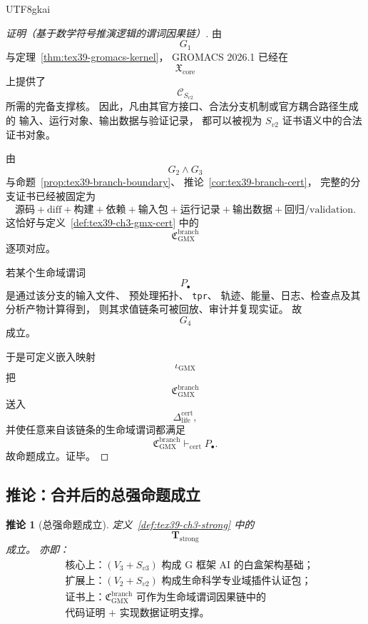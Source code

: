 \documentclass[12pt]{article}
\newtheorem{corollary}{推论}[section]
\begin{document}
\begin{CJK*}{UTF8}{gkai}
\begin{proof}[证明（基于数学符号推演逻辑的谓词因果链）]
由
\[
  G_1
\]
与定理~\ref{thm:tex39-gromacs-kernel}，
GROMACS 2026.1 已经在
\[
  \mathfrak X_{\mathrm{core}}
\]
上提供了
\[
  \mathcal C_{S_{v2}}
\]
所需的完备支撑核。
因此，凡由其官方接口、合法分支机制或官方耦合路径生成的
输入、运行对象、输出数据与验证记录，
都可以被视为
$S_{v2}$ 证书语义中的合法证书对象。

由
\[
  G_2\wedge G_3
\]
与命题~\ref{prop:tex39-branch-boundary}、
推论~\ref{cor:tex39-branch-cert}，
完整的分支证书已经被固定为
\[
  \text{源码}
  +\text{diff}
  +\text{构建}
  +\text{依赖}
  +\text{输入包}
  +\text{运行记录}
  +\text{输出数据}
  +\text{回归/validation}.
\]
这恰好与定义~\ref{def:tex39-ch3-gmx-cert}
中的
\[
  \mathfrak C_{\mathrm{GMX}}^{\mathrm{branch}}
\]
逐项对应。

若某个生命域谓词
\[
  P_{\bullet}
\]
是通过该分支的输入文件、
预处理拓扑、
\texttt{tpr}、
轨迹、能量、日志、检查点及其分析产物计算得到，
则其求值链条可被回放、审计并复现实证。
故
\[
  G_4
\]
成立。

于是可定义嵌入映射
\[
  \iota_{\mathrm{GMX}}
\]
把
\[
  \mathfrak C_{\mathrm{GMX}}^{\mathrm{branch}}
\]
送入
\[
  \Delta_{\mathrm{life}}^{\mathrm{cert}},
\]
并使任意来自该链条的生命域谓词都满足
\[
  \mathfrak C_{\mathrm{GMX}}^{\mathrm{branch}}
  \vdash_{\mathrm{cert}}
  P_{\bullet}.
\]
故命题成立。证毕。
\end{proof}

\subsection{推论：合并后的总强命题成立}
\label{subsec:tex39-ch3-corollary}

\begin{corollary}[总强命题成立]
\label{cor:tex39-ch3-strong}
定义~\ref{def:tex39-ch3-strong} 中的
\[
  \mathbf T_{\mathrm{strong}}
\]
成立。
亦即：
\[
  \boxed{
    \begin{aligned}
      &\text{核心上：}(V_3+S_{v3})\text{ 构成 G 框架 AI 的白盒架构基础；}\\
      &\text{扩展上：}(V_2+S_{v2})\text{ 构成生命科学专业域插件认证包；}\\
      &\text{证书上：}
      \mathfrak C_{\mathrm{GMX}}^{\mathrm{branch}}
      \text{ 可作为生命域谓词因果链中的}\\
      &\text{代码证明 + 实现数据证明支撑。}
    \end{aligned}
  }
\]
\end{corollary}


\end{CJK*}
\end{document}
